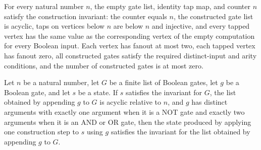 \begin{theorem}
\label{BoolCircuit.nnInv_nil}
\leanok
{}
For every natural number $n$, the empty gate list, identity tap map, and counter $n$
satisfy the construction invariant: the counter equals $n$, the constructed gate list is
acyclic, taps on vertices below $n$ are below $n$ and injective, and every tapped vertex
has the same value as the corresponding vertex of the empty computation for every
Boolean input. Each vertex has fanout at most two, each tapped vertex has fanout zero,
all constructed gates satisfy the required distinct-input and arity conditions, and the
number of constructed gates is at most zero.
\end{theorem}

\begin{theorem}
\label{BoolCircuit.nnInv_step}
\leanok
{}
Let $n$ be a natural number, let $G$ be a finite list of Boolean gates, let $g$ be a
Boolean gate, and let $s$ be a state. If $s$ satisfies the invariant for $G$, the list
obtained by appending $g$ to $G$ is acyclic relative to $n$, and $g$ has distinct
arguments with exactly one argument when it is a NOT gate and exactly two arguments when
it is an AND or OR gate, then the state produced by applying one construction step to
$s$ using $g$ satisfies the invariant for the list obtained by appending $g$ to $G$.
\end{theorem}

